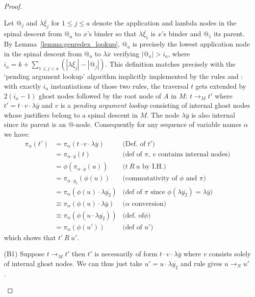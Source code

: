 \documentclass{article}
\theoremstyle{definition}
\def\coresymbol{\pi} %
\begin{document}
\begin{proof}
\begin{description}
Let $@_j$ and $\lambda\overline{\xi_j}$ for $1\leq j\leq a$ denote the application and lambda nodes in the spinal descent from $@_a$ to $x$'s binder so that $\lambda\overline{\xi_1}$ is $x$'s binder and $@_1$ its parent.
By Lemma~\ref{lemma:genredex_lookup}, $@_a$ is precisely the lowest application node in the spinal descent from $@_a$ to $\lambda\overline{x}$ verifying $|@_a| >  i_a$, where $i_a = k + \sum_{1\leq j< a} (|\lambda\overline{\xi_j}| - |@_j|)$. This definition matches precisely with the `pending argument lookup' algorithm implicitly implemented by the rules  and : with exactly $i_a$ instantiations of those two rules, the traversal $t$ gets extended by $2(i_a-1)$ ghost nodes followed by the root node of $A$ in $M$: $t \rightarrow_M t'$ where $t' = t \cdot v \cdot \lambda\overline{y}$
and $v$ is a \emph{pending argument lookup} consisting of internal ghost nodes whose justifiers belong to a spinal descent in $M$. The node $\lambda\overline{y}$ is also internal since its parent is an $@$-node. Consequently for any sequence of variable names $\alpha$ we have:
\begin{align*}
\coresymbol_\alpha(t') &= \coresymbol_\alpha(t \cdot v \cdot \lambda\overline{y}) & \mbox{(Def.~of $t'$)} \\
                &= \coresymbol_{\alpha \cdot \overline{y}}(t) & \mbox{(def of $\coresymbol$, $v$ contains internal nodes)} \\
                &= \phi(\coresymbol_{\alpha \cdot \overline{y}}(u)) & \mbox{($t~R~u$ by I.H.)}\\
                &= \coresymbol_{\alpha \cdot \overline{y_2}}(\phi(u)) & \mbox{(commutativity of $\phi$ and $\coresymbol$)}\\
                &= \coresymbol_\alpha(\phi(u) \cdot \lambda\overline{y_2}) & \mbox{(def of $\coresymbol$ since $\phi(\lambda\overline{y_2}) = \lambda\overline{y}$)}\\
                &\equiv \coresymbol_\alpha(\phi(u) \cdot \lambda\overline{y}) & \mbox{($\alpha$ conversion)}\\
                &\equiv \coresymbol_\alpha(\phi(u \cdot \lambda\overline{y_2})) & \mbox{(def.~of$\phi$)}\\
                &= \coresymbol_\alpha(\phi(u')) & \mbox{(def of $u'$)}
\end{align*}
which shows that $t'~R~u'$.

(B1) Suppose $t \rightarrow_M t'$ then $t'$ is necessarily of form $t \cdot v\cdot \lambda\overline{y}$ where $v$ consists solely of internal ghost nodes. We can thus just take $u' = u \cdot \lambda\overline{y_2}$ and rule  gives $u \rightarrow_N u'$.


\end{description}
\end{proof}
\end{document}
